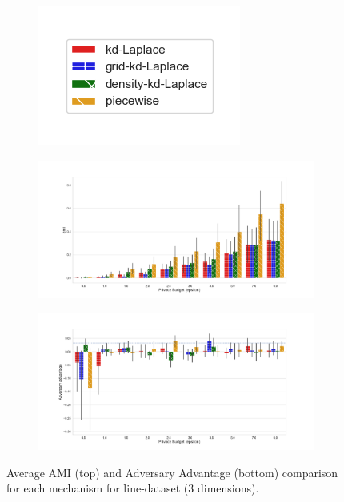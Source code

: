 \begin{figure}[H]
  \centering
  \begin{subfigure}{0.30\textwidth}
    \includegraphics[width=\textwidth]{Results/kd-laplace/ami_bar_comparison_legend.png}
  \end{subfigure}
  \begin{subfigure}{1\textwidth}
    \includegraphics[width=1\textwidth]{Results/nd-laplace/ami_line-dataset_comparison.png}
  \end{subfigure}
  \begin{subfigure}{1\textwidth}
    \includegraphics[width=1\textwidth]{Results/nd-laplace/attack_adv_line-dataset_comparison.png}
  \end{subfigure}
  \caption{Average AMI (top) and Adversary Advantage (bottom) comparison for each mechanism for line-dataset (3 dimensions).}
  \label{fig:utility_line-dataset_comparison_nd_plot}
\end{figure}
\newpage



